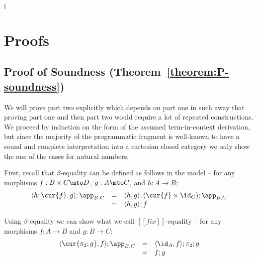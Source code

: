 i\section{Proofs}
\label{sec:proofs}

\subsection{Proof of Soundness (Theorem~\ref{theorem:P-soundness})}
\label{subsec:proof_of_soundness}
We will prove part two explicitly which depends on part one in such
away that proving part one and then part two would require a lot of
repeated constructions.  We proceed by induction on the form of the
assumed term-in-context derivation, but since the majority of the
programmatic fragment is well-known to have a sound and complete
interpretation into a cartesian closed category we only show the
one of the cases for natural numbers.

First, recall that $\beta$-equality can be defined as follows in the
model -- for any morphisms $f : B \times C \mto D$, $g : A \mto C$,
and $h : A \to B$:
\[
\begin{array}{lllll}
  \langle h;\cur{f},g \rangle; \app_{B,C} & = &  \langle h,g \rangle;(\cur{f} \times \id_C);\app_{B,C}\\
  & = & \langle h, g\rangle;f\\
\end{array}
\]

Using $\beta$-equality we can show what we call $[[fix]]$-equality --
for any morphisms $f : A \to B$ and $g : B \to C$:
\[
\begin{array}{llll}
  \langle \cur{\pi_2;g},f \rangle;\app_{B,C}
  & = & \langle \id_A, f \rangle;\pi_2;g\\
  & = & f;g\\
\end{array}
\]

